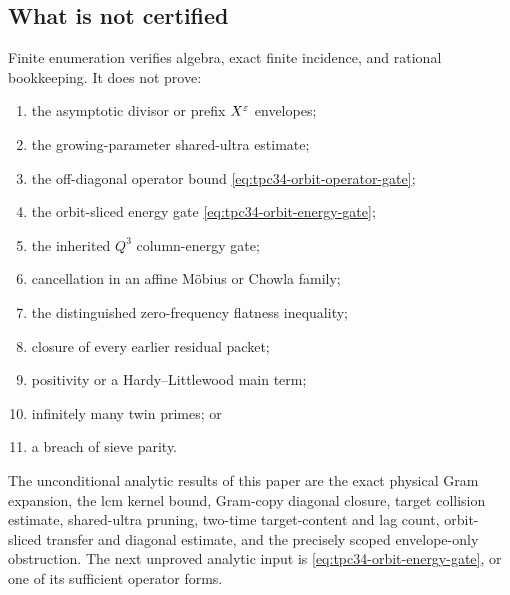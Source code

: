 \subsection{What is not certified}

Finite enumeration verifies algebra, exact finite incidence, and rational
bookkeeping.  It does not prove:
\begin{enumerate}[label=\textup{(\roman*)}]
 \item the asymptotic divisor or prefix \(X^\varepsilon\) envelopes;
 \item the growing-parameter shared-ultra estimate;
 \item the off-diagonal operator bound
 \eqref{eq:tpc34-orbit-operator-gate};
 \item the orbit-sliced energy gate
 \eqref{eq:tpc34-orbit-energy-gate};
 \item the inherited \(Q^3\) column-energy gate;
 \item cancellation in an affine M\"obius or Chowla family;
 \item the distinguished zero-frequency flatness inequality;
 \item closure of every earlier residual packet;
 \item positivity or a Hardy--Littlewood main term;
 \item infinitely many twin primes; or
 \item a breach of sieve parity.
\end{enumerate}

The unconditional analytic results of this paper are the exact physical
Gram expansion, the lcm kernel bound, Gram-copy diagonal closure, target
collision estimate, shared-ultra pruning, two-time target-content and lag
count, orbit-sliced transfer and diagonal estimate, and the precisely
scoped envelope-only obstruction.  The next unproved analytic input is
\eqref{eq:tpc34-orbit-energy-gate}, or one of its sufficient operator
forms.
